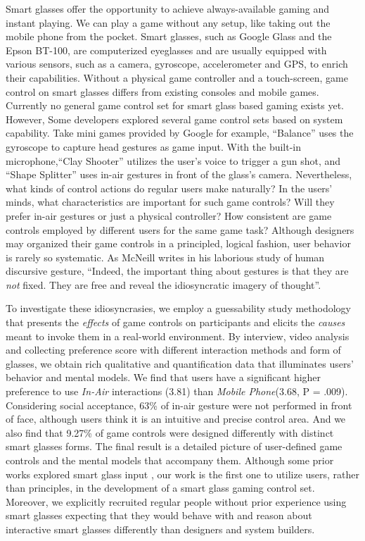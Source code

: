 \documentclass{sigchi}
\begin{document}
Smart glasses offer the opportunity to achieve always-available gaming and instant playing. We can play a game without any setup, like taking out the mobile phone from the pocket. Smart glasses, such as Google Glass and the Epson BT-100, are computerized eyeglasses and are usually equipped with various sensors, such as a camera, gyroscope, accelerometer and GPS, to enrich their capabilities. 
Without a physical game controller and a touch-screen, game control on smart glasses differs from existing consoles and mobile games. Currently no general game control set for smart glass based gaming exists yet. However, Some developers explored several game control sets based on system capability. Take mini games \cite{MiniGames} provided by Google for example, ``Balance'' uses the gyroscope to capture head gestures as game input. With the built-in microphone,``Clay Shooter'' utilizes the user's voice to trigger a gun shot, and ``Shape Splitter'' uses in-air gestures in front of the glass's camera.  
Nevertheless, what kinds of control actions do regular users make naturally? In the users' minds, what characteristics are important for such game controls? Will they prefer in-air gestures or just a physical controller? How consistent are game controls employed by different users for the same game task? 
Although designers may organized their game controls in a principled, logical fashion, user behavior is rarely so systematic. As McNeill \cite{HandAndMind} writes in his laborious study of human discursive gesture, ``Indeed, the important thing about gestures is that they are \emph{not} fixed. They are free and reveal the idiosyncratic imagery of thought''.


To investigate these idiosyncrasies, we employ a guessability study methodology \cite{Wobbrock:2005:MGS:1056808.1057043} that presents the \emph{effects} of game controls on participants and elicits the \emph{causes} meant to invoke them in a real-world environment. By interview, video analysis and collecting preference score with different interaction methods and form of glasses, we obtain rich qualitative and quantification data that illuminates users' behavior and mental models. 
We find that users have a significant higher preference to use \emph{In-Air} interactions (3.81) than \emph{Mobile Phone}(3.68, P = .009). 
Considering social acceptance, 63\% of in-air gesture were not performed in front of face, although users think it is an intuitive and precise control area. 
And we also find that 9.27\% of game controls were designed differently with distinct smart glasses forms.
 The final result is a detailed picture of user-defined game controls and the mental models that accompany them. Although some prior works explored smart glass input \cite{Colaco:2013:MCL:2501988.2502042,Serrano:2014:EUH:2611247.2556984}, our work is the first one to utilize users, rather than principles, in the development of a smart glass gaming control set. Moreover, we explicitly recruited regular people without prior experience using smart glasses expecting that they would behave with and reason about interactive smart glasses differently than designers and system builders.
\end{document}
